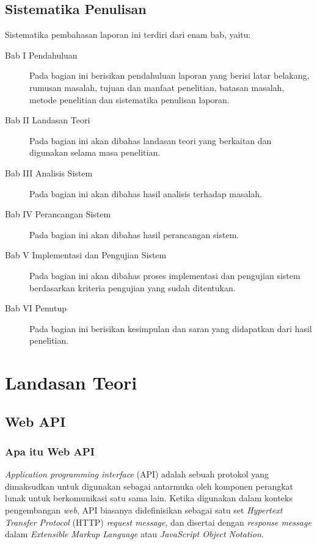 \documentclass[a4paper, 12pt, oneside]{report}
\begin{document}
\section{Sistematika Penulisan}
Sistematika pembahasan laporan ini terdiri dari enam bab, yaitu:
\begin{description}
  \item[Bab I Pendahuluan] Pada bagian ini berisikan pendahuluan laporan yang berisi latar belakang, rumusan masalah, tujuan dan manfaat penelitian, batasan masalah, metode penelitian dan sistematika penulisan laporan.
  \item[Bab II Landasan Teori] Pada bagian ini akan dibahas landasan teori yang berkaitan dan digunakan selama masa penelitian.
  \item[Bab III Analisis Sistem] Pada bagian ini akan dibahas hasil analisis terhadap masalah.
  \item[Bab IV Perancangan Sistem] Pada bagian ini akan dibahas hasil perancangan sistem.
  \item[Bab V Implementasi dan Pengujian Sistem] Pada bagian ini akan dibahas proses implementasi dan pengujian sistem berdasarkan kriteria pengujian yang sudah ditentukan.
  \item[Bab VI Penutup] Pada bagian ini berisikan kesimpulan dan saran yang didapatkan dari hasil penelitian.
\end{description}

\chapter{Landasan Teori} \label{bab:2}

\section{Web API}
\onehalfspacing
\subsection{Apa itu Web API}

\onehalfspacing \textit{Application programming interface} (API) adalah sebuah protokol yang dimaksudkan untuk digunakan sebagai antarmuka oleh komponen perangkat lunak untuk berkomunikasi satu sama lain. Ketika digunakan dalam konteks pengembangan \textit{web}, API biasanya didefinisikan sebagai satu set \textit{Hypertext Transfer Protocol} (HTTP) \textit{request message}, dan disertai dengan \textit{response message} dalam \textit{Extensible Markup Language} atau \textit{JavaScript Object Notation}.
\end{document}
